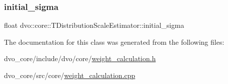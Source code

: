 \subsubsection{\texorpdfstring{initial\+\_\+sigma}{initial\_sigma}}
{\footnotesize\ttfamily float dvo\+::core\+::\+T\+Distribution\+Scale\+Estimator\+::initial\+\_\+sigma\hspace{0.3cm}{\ttfamily [protected]}}



The documentation for this class was generated from the following files\+:\begin{DoxyCompactItemize}
\item 
dvo\+\_\+core/include/dvo/core/\mbox{\hyperlink{weight__calculation_8h}{weight\+\_\+calculation.\+h}}\item 
dvo\+\_\+core/src/core/\mbox{\hyperlink{weight__calculation_8cpp}{weight\+\_\+calculation.\+cpp}}\end{DoxyCompactItemize}
